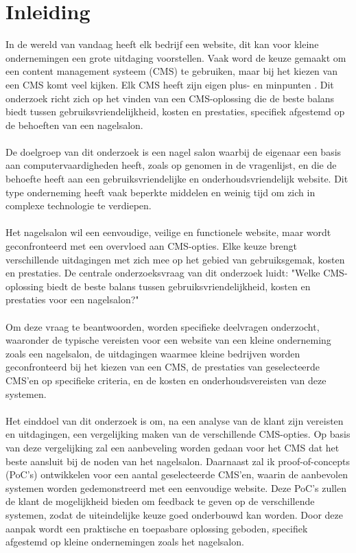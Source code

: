 
\section{Inleiding}%
\label{sec:inleiding}
\noindent
In de wereld van vandaag heeft elk bedrijf een website, dit kan voor kleine ondernemingen een grote uitdaging voorstellen. Vaak word de keuze gemaakt om een content management systeem (CMS) te gebruiken, maar bij het kiezen van een CMS komt veel kijken. Elk CMS heeft zijn eigen plus- en minpunten \autocite{Khalil2024}. Dit onderzoek richt zich op het vinden van een CMS-oplossing die de beste balans biedt tussen gebruiksvriendelijkheid, kosten en prestaties, specifiek afgestemd op de behoeften van een nagelsalon.
\\ \\
De doelgroep van dit onderzoek is een nagel salon waarbij de eigenaar een basis aan computervaardigheden heeft, zoals op genomen in de vragenlijst, en die de behoefte heeft aan een gebruiksvriendelijke en onderhoudsvriendelijk website. Dit type onderneming heeft vaak beperkte middelen en weinig tijd om zich in complexe technologie te verdiepen.
\\ \\
Het nagelsalon wil een eenvoudige, veilige en functionele website, maar wordt geconfronteerd met een overvloed aan CMS-opties. Elke keuze brengt verschillende uitdagingen met zich mee op het gebied van gebruiksgemak, kosten en prestaties. De centrale onderzoeksvraag van dit onderzoek luidt: "Welke CMS-oplossing biedt de beste balans tussen gebruiksvriendelijkheid, kosten en prestaties voor een nagelsalon?"
\\ \\
Om deze vraag te beantwoorden, worden specifieke deelvragen onderzocht, waaronder de typische vereisten voor een website van een kleine onderneming zoals een nagelsalon, de uitdagingen waarmee kleine bedrijven worden geconfronteerd bij het kiezen van een CMS, de prestaties van geselecteerde CMS’en op specifieke criteria, en de kosten en onderhoudsvereisten van deze systemen.
\\ \\
Het einddoel van dit onderzoek is om, na een analyse van de klant zijn vereisten en uitdagingen, een vergelijking maken van de verschillende CMS-opties. Op basis van deze vergelijking zal een aanbeveling worden gedaan voor het CMS dat het beste aansluit bij de noden van het nagelsalon. Daarnaast zal ik proof-of-concepts (PoC's) ontwikkelen voor een aantal geselecteerde CMS'en, waarin de aanbevolen systemen worden gedemonstreerd met een eenvoudige website. Deze PoC's zullen de klant de mogelijkheid bieden om feedback te geven op de verschillende systemen, zodat de uiteindelijke keuze goed onderbouwd kan worden. Door deze aanpak wordt een praktische en toepasbare oplossing geboden, specifiek afgestemd op kleine ondernemingen zoals het nagelsalon.


